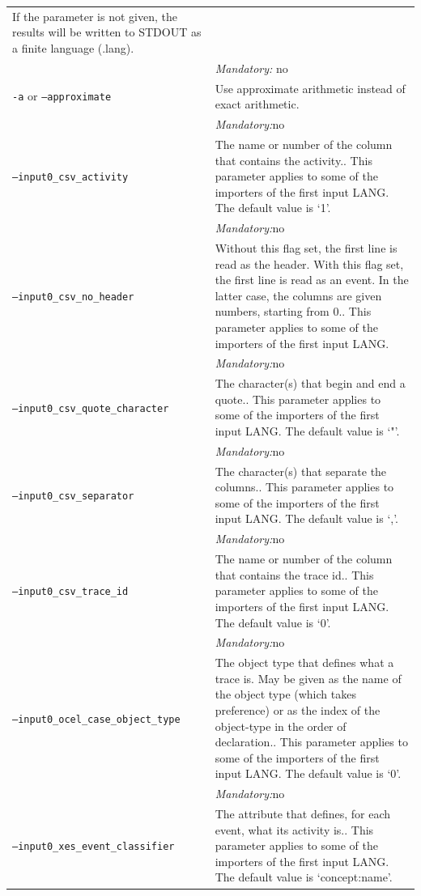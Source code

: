{\begin{tabularx}{\linewidth}{lX}
If the parameter is not given, the results will be written to STDOUT as a finite language (.lang).\\
&\textit{Mandatory:} \quad no\\
\texttt{-a} or \texttt{--approximate} & Use approximate arithmetic instead of exact arithmetic.\\
&\textit{Mandatory:}\quad no\\
\texttt{--input0\_csv\_activity} & The name or number of the column that contains the activity.. This parameter applies to some of the importers of the first input LANG. The default value is `1'.\\
&\textit{Mandatory:}\quad no\\
\texttt{--input0\_csv\_no\_header} & Without this flag set, the first line is read as the header. 
    With this flag set, the first line is read as an event. In the latter case, the columns are given numbers, starting from 0.. This parameter applies to some of the importers of the first input LANG. \\
&\textit{Mandatory:}\quad no\\
\texttt{--input0\_csv\_quote\_character} & The character(s) that begin and end a quote.. This parameter applies to some of the importers of the first input LANG. The default value is `"'.\\
&\textit{Mandatory:}\quad no\\
\texttt{--input0\_csv\_separator} & The character(s) that separate the columns.. This parameter applies to some of the importers of the first input LANG. The default value is `,'.\\
&\textit{Mandatory:}\quad no\\
\texttt{--input0\_csv\_trace\_id} & The name or number of the column that contains the trace id.. This parameter applies to some of the importers of the first input LANG. The default value is `0'.\\
&\textit{Mandatory:}\quad no\\
\texttt{--input0\_ocel\_case\_object\_type} & The object type that defines what a trace is. May be given as the name of the object type (which takes preference) or as the index of the object-type in the order of declaration.. This parameter applies to some of the importers of the first input LANG. The default value is `0'.\\
&\textit{Mandatory:}\quad no\\
\texttt{--input0\_xes\_event\_classifier} & The attribute that defines, for each event, what its activity is.. This parameter applies to some of the importers of the first input LANG. The default value is `concept:name'.\\

\end{tabularx}}
